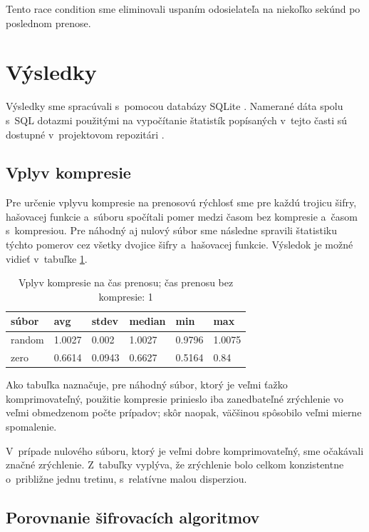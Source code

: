 \documentclass[12pt,a4paper]{article}
\begin{document}
Tento race condition sme eliminovali uspaním odosielateľa na niekoľko
sekúnd po poslednom prenose.

\section{Výsledky}

Výsledky sme spracúvali s~pomocou databázy SQLite \cite{sqlite}. Namerané
dáta spolu s~SQL dotazmi použitými na vypočítanie štatistík popísaných
v~tejto časti sú dostupné v~projektovom repozitári \cite{proj}.

\subsection{Vplyv kompresie}

Pre určenie vplyvu kompresie na prenosovú rýchlosť sme pre každú trojicu
šifry, hašovacej funkcie a~súboru spočítali pomer medzi časom bez
kompresie a~časom s~kompresiou. Pre náhodný aj nulový súbor sme následne
spravili štatistiku týchto pomerov cez všetky dvojice šifry a~hašovacej
funkcie. Výsledok je možné vidieť v~tabuľke \ref{tbl:compression}.

\begin{table}\centering
    \caption{Vplyv kompresie na čas prenosu; čas prenosu bez kompresie: 1}
    \label{tbl:compression}

    \begin{tabular}{|l||l|l|l|l|l|}
        \hline
        \bf súbor & \bf  avg & \bf stdev & \bf median & \bf min & \bf max \\ \hline 
        random & 1.0027 & 0.002 & 1.0027 & 0.9796 & 1.0075 \\ \hline
        zero & 0.6614 & 0.0943 & 0.6627 & 0.5164 & 0.84\\ \hline
    \end{tabular}
\end{table}

Ako tabuľka naznačuje, pre náhodný súbor, ktorý je veľmi ťažko
komprimovateľný, použitie kompresie prinieslo iba zanedbateľné zrýchlenie
vo veľmi obmedzenom počte prípadov; skôr naopak, väčšinou spôsobilo veľmi
mierne spomalenie.

V~prípade nulového súboru, ktorý je veľmi dobre komprimovateľný, sme
očakávali značné zrýchlenie. Z~tabuľky vyplýva, že zrýchlenie bolo celkom
konzistentne o~približne jednu tretinu, s~relatívne malou disperziou.

\subsection{Porovnanie šifrovacích algoritmov}
\label{sec:cipher-comparison}
\end{document}
